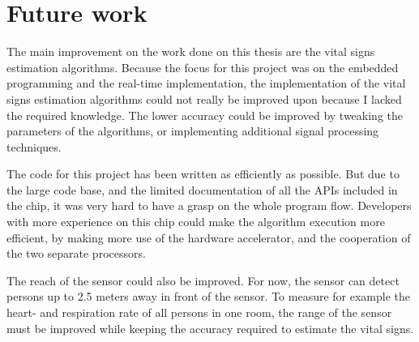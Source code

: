 \section{Future work}
The main improvement on the work done on this thesis are the vital signs estimation algorithms. Because the focus for this project was on the embedded programming and the real-time implementation, the implementation of the vital signs estimation algorithms could not really be improved upon because I lacked the required knowledge. The lower accuracy could be improved by tweaking the parameters of the algorithms, or implementing additional signal processing techniques. 

The code for this project has been written as efficiently as possible. But due to the large code base, and the limited documentation of all the APIs included in the chip, it was very hard to have a grasp on the whole program flow. Developers with more experience on this chip could make the algorithm execution more efficient, by making more use of the hardware accelerator, and the cooperation of the two separate processors.

The reach of the sensor could also be improved. For now, the sensor can detect persons up to 2.5 meters away in front of the sensor. To measure for example the heart- and respiration rate of all persons in one room, the range of the sensor must be improved while keeping the accuracy required to estimate the vital signs.